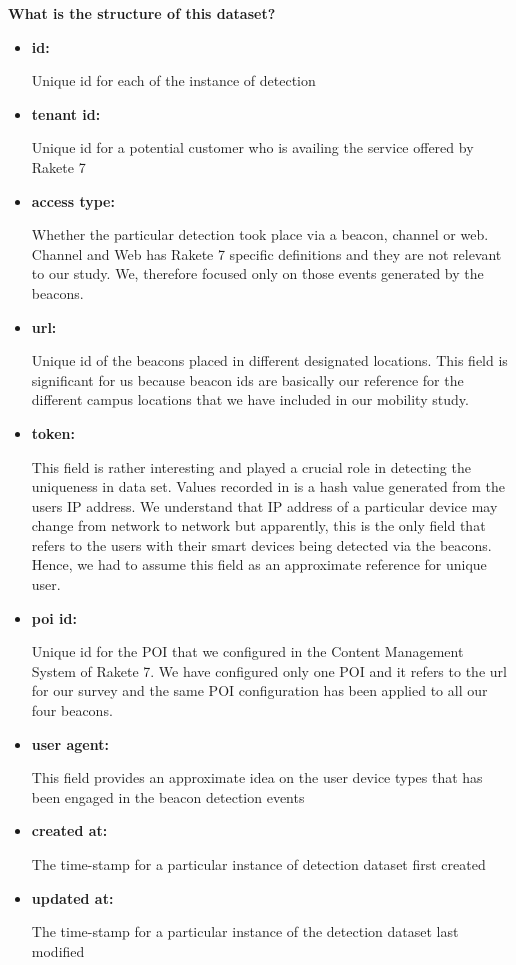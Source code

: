 \textbf{What is the structure of this dataset?}
\begin{itemize}
	\item \textbf{id:}
	\par Unique id for each of the instance of detection
	\item \textbf{tenant id:}
	\par Unique id for a potential customer who is availing the service offered by Rakete 7
	\item \textbf{access type:}
	\par Whether the particular detection took place via a beacon, channel or web. Channel and Web has Rakete 7 specific definitions and they are not relevant to our study. We, therefore focused only on those events generated by the beacons.
	\item \textbf{url:} 
	\par Unique id of the beacons placed in different designated locations. This field is significant for us because beacon ids are basically our reference for the different campus locations that we have included in our mobility study.
	\item \textbf{token:}
	\par This field is rather interesting and played a crucial role in detecting the uniqueness in data set. Values recorded in is a hash value generated from the users IP address. We understand that IP address of a particular device may change from network to network but apparently, this is the only field that refers to the users with their smart devices being detected via the beacons. Hence, we had to assume this field as an approximate reference for unique user.
	\item \textbf{poi id:}
	\par Unique id for the POI that we configured in the Content Management System of Rakete 7. We have configured only one POI and it refers to the url for our survey and the same POI configuration has been applied to all our four beacons.
	\item \textbf{user agent:}
	\par This field provides an approximate idea on the user device types that has been engaged in the beacon detection events
	\item \textbf{created at:}
	\par The time-stamp for a particular instance of detection dataset first created
	\item \textbf{updated at:}
	\par The time-stamp for a particular instance of the detection dataset last modified
\end{itemize}

